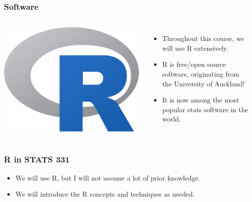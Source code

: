 \documentclass{beamer}
\begin{document}
\begin{frame}
\frametitle{Software}

    \begin{columns} %
        \includegraphics[width=1\linewidth]{images/R.png}

        \begin{itemize}
        \item Throughout this course, we will use R extensively.\pause
        \item R is free/open source software, originating from
              the University of Auckland!\pause
        \item It is now among the most popular stats software
              in the world.
        \end{itemize}
     \end{columns}

\end{frame}


\begin{frame}
\frametitle{R in STATS 331}
\begin{itemize}
\item We will use R, but I will not assume a lot of prior knowledge.\pause \\[0.5em]
\item We will introduce the R concepts and techniques as needed.
\end{itemize}


\end{frame}
\end{document}
